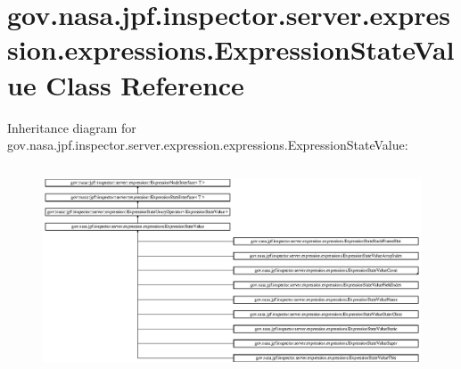 \hypertarget{classgov_1_1nasa_1_1jpf_1_1inspector_1_1server_1_1expression_1_1expressions_1_1_expression_state_value}{}\section{gov.\+nasa.\+jpf.\+inspector.\+server.\+expression.\+expressions.\+Expression\+State\+Value Class Reference}
\label{classgov_1_1nasa_1_1jpf_1_1inspector_1_1server_1_1expression_1_1expressions_1_1_expression_state_value}
Inheritance diagram for gov.\+nasa.\+jpf.\+inspector.\+server.\+expression.\+expressions.\+Expression\+State\+Value\+:\begin{figure}[H]
\begin{center}
\leavevmode
\includegraphics[height=6.169491cm]{classgov_1_1nasa_1_1jpf_1_1inspector_1_1server_1_1expression_1_1expressions_1_1_expression_state_value}
\end{center}
\end{figure}
